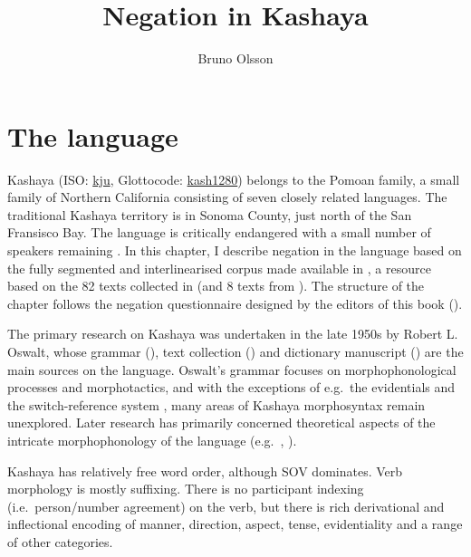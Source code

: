 \documentclass[output=paper,modfonts,nonflat,colorlinks,citecolor=brown]{langscibook}
\author{Bruno Olsson\affiliation{University of Regensburg}}
\title{Negation in Kashaya}
\begin{document}
\maketitle

\section{The language}
   
Kashaya (ISO: \href{https://iso639-3.sil.org/code/kju}{kju}, Glottocode: \href{https://glottolog.org/resource/languoid/id/kash1280}{kash1280}) belongs to the Pomoan family, a small family of Northern California consisting of seven closely related languages. The traditional Kashaya territory is in Sonoma County, just north of the San Fransisco Bay. The language is critically endangered with a small number of speakers remaining \parencite[111]{Golla2011}. In this chapter, I describe negation in the language based on the fully segmented and interlinearised corpus made available in \citet{Buckley2019}, a resource based on the 82 texts collected in \citet{Oswalt1964} (and 8 texts from \citealt{Halpern1940}).
The structure of the chapter follows the negation questionnaire designed by the editors of this book ().

The primary research on Kashaya was undertaken in the late 1950s by Robert L. Oswalt, whose grammar (\citealt{Oswalt1961}), text collection (\citealt{Oswalt1964}) and dictionary manuscript (\citealt{Oswalt}) are the main sources on the language. 
Oswalt's grammar focuses on morphophonological processes and morphotactics, and with the exceptions of e.g.\ the evidentials \citep{Oswalt1986} and the switch-reference system \citep{Oswalt1983}, many areas of Kashaya morphosyntax remain unexplored. 
Later research has primarily concerned theoretical aspects of the intricate morphophonology of the language (e.g.\ \citealt{Buckley1994a, Buckley1994}, \citeyear{Buckley1997}).

Kashaya has relatively free word order, although SOV dominates. Verb morphology is mostly suffixing. There is no participant indexing (i.e.\ person/number agreement) on the verb, but there is rich derivational and inflectional encoding of manner, direction, aspect, tense, evidentiality and a range of other categories.
\end{document}
